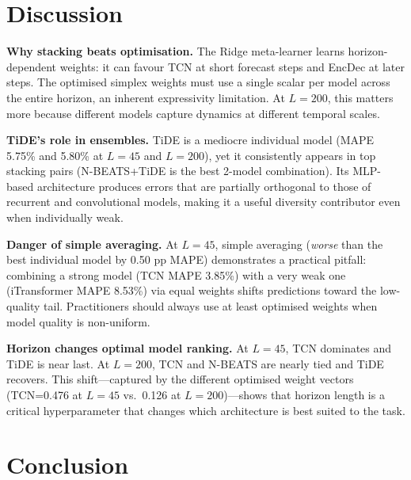 \documentclass[conference]{IEEEtran}
\begin{document}
\section{Discussion}
\label{sec:discussion}

\textbf{Why stacking beats optimisation.} The Ridge meta-learner learns
horizon-dependent weights: it can favour TCN at short forecast steps and EncDec
at later steps. The optimised simplex weights must use a single scalar per
model across the entire horizon, an inherent expressivity limitation. At
$L=200$, this matters more because different models capture dynamics at
different temporal scales.

\textbf{TiDE's role in ensembles.} TiDE is a mediocre individual model (MAPE
5.75\% and 5.80\% at $L=45$ and $L=200$), yet it consistently appears in top
stacking pairs (N-BEATS+TiDE is the best 2-model combination). Its MLP-based
architecture produces errors that are partially orthogonal to those of
recurrent and convolutional models, making it a useful diversity contributor
even when individually weak.

\textbf{Danger of simple averaging.} At $L=45$, simple averaging
(\textit{worse} than the best individual model by 0.50 pp MAPE) demonstrates
a practical pitfall: combining a strong model (TCN MAPE 3.85\%) with a very
weak one (iTransformer MAPE 8.53\%) via equal weights shifts predictions toward
the low-quality tail. Practitioners should always use at least optimised
weights when model quality is non-uniform.

\textbf{Horizon changes optimal model ranking.} At $L=45$, TCN dominates and
TiDE is near last. At $L=200$, TCN and N-BEATS are nearly tied and TiDE
recovers. This shift---captured by the different optimised weight vectors
(TCN=0.476 at $L=45$ vs.\ 0.126 at $L=200$)---shows that horizon length is a
critical hyperparameter that changes which architecture is best suited to the
task.

\section{Conclusion}
\label{sec:conclusion}
\end{document}
